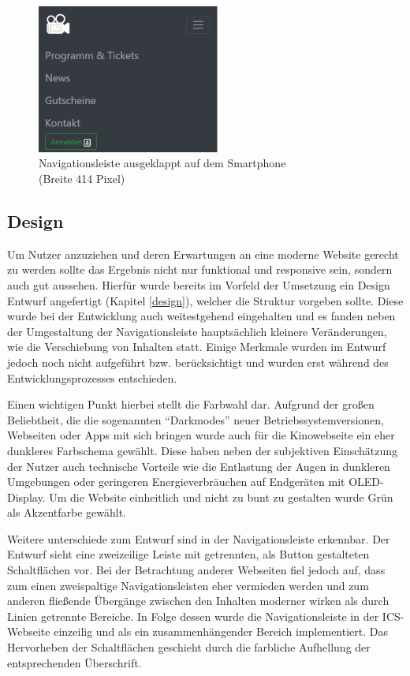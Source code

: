 	\begin{figure}[H]
		\centering 
		\includegraphics[width=6cm]{img/navLeisteAus.png}
		\captionsetup{format=hang}
		\caption[Navigationsleiste ausgeklappt]{\label{fig:navLeisteAus} Navigationsleiste ausgeklappt auf dem Smartphone \\ (Breite 414 Pixel)}
	\end{figure}

	\subsection{Design} \label{subdesign}
	Um Nutzer anzuziehen und deren Erwartungen an eine moderne Website gerecht zu werden sollte das Ergebnis nicht nur funktional und responsive sein, sondern auch gut aussehen. Hierfür wurde bereits im Vorfeld der Umsetzung ein Design Entwurf angefertigt (Kapitel \vref{design}), welcher die Struktur vorgeben sollte. Diese wurde bei der Entwicklung auch weitestgehend eingehalten und es fanden neben der Umgestaltung der Navigationsleiste hauptsächlich kleinere Veränderungen, wie die Verschiebung von Inhalten statt. Einige Merkmale wurden im Entwurf jedoch noch nicht aufgeführt bzw. berücksichtigt und wurden erst während des Entwicklungsprozesses entschieden. 
	
	
	Einen wichtigen Punkt hierbei stellt die Farbwahl dar. Aufgrund der großen Beliebtheit, die die sogenannten \enquote{Darkmodes} neuer Betriebssystemversionen, Webseiten oder Apps mit sich bringen wurde auch für die Kinowebseite ein eher dunkleres Farbschema gewählt. Diese haben neben der subjektiven Einschätzung der Nutzer auch technische Vorteile wie die Entlastung der Augen in dunkleren Umgebungen oder geringeren Energieverbräuchen auf Endgeräten mit OLED-Display\autocite[Vgl.][]{OLED}. Um die Website einheitlich und nicht zu bunt zu gestalten wurde Grün als Akzentfarbe gewählt.
	
	
	Weitere unterschiede zum Entwurf sind in der Navigationsleiste erkennbar. Der Entwurf sieht eine zweizeilige Leiste mit getrennten, als Button gestalteten Schaltflächen vor. Bei der Betrachtung anderer Webseiten fiel jedoch auf, dass zum einen zweispaltige Navigationsleisten eher vermieden werden und zum anderen fließende Übergänge zwischen den Inhalten moderner wirken als durch Linien getrennte Bereiche. In Folge dessen wurde die Navigationsleiste in der \ac{ICS}-Webseite einzeilig und als ein zusammenhängender Bereich implementiert. Das Hervorheben der Schaltflächen geschieht durch die farbliche Aufhellung der entsprechenden Überschrift. 
	
